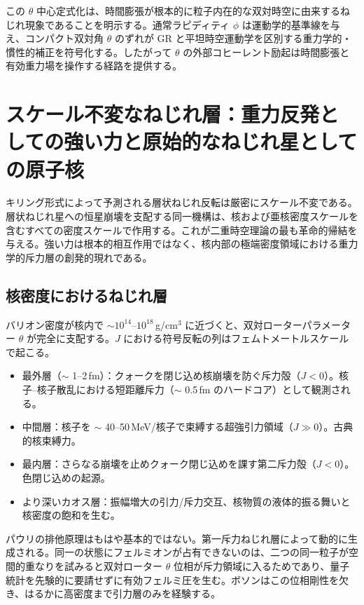 \documentclass[dvipdfmx,a4paper]{article}
\begin{document}
この $\theta$ 中心定式化は、時間膨張が根本的に粒子内在的な双対時空に由来するねじれ現象であることを明示する。通常ラピディティ $\phi$ は運動学的基準線を与え、コンパクト双対角 $\theta$ のずれが GR と平坦時空運動学を区別する重力学的・慣性的補正を符号化する。したがって $\theta$ の外部コヒーレント励起は時間膨張と有効重力場を操作する経路を提供する。

\section{スケール不変なねじれ層：重力反発としての強い力と原始的なねじれ星としての原子核}
\label{sec:nuclear}

キリング形式によって予測される層状ねじれ反転は厳密にスケール不変である。層状ねじれ星への恒星崩壊を支配する同一機構は、核および亜核密度スケールを含むすべての密度スケールで作用する。これが二重時空理論の最も革命的帰結を与える。強い力は根本的相互作用ではなく、核内部の極端密度領域における重力学的斥力層の創発的現れである。

\subsection{核密度におけるねじれ層}

バリオン密度が核内で $\sim 10^{14}$--$10^{18}$\,g/cm$^3$ に近づくと、双対ローターパラメーター $\theta$ が完全に支配する。$J$ における符号反転の列はフェムトメートルスケールで起こる。

\begin{itemize}
\item 最外層（$\sim$ 1--2\,fm）：クォークを閉じ込め核崩壊を防ぐ斥力殻（$J < 0$）。核子--核子散乱における短距離斥力（$\sim$ 0.5\,fm のハードコア）として観測される。
\item 中間層：核子を $\sim$ 40--50\,MeV/核子で束縛する超強引力領域（$J \gg 0$）。古典的核束縛力。
\item 最内層：さらなる崩壊を止めクォーク閉じ込めを課す第二斥力殻（$J < 0$）。色閉じ込めの起源。
\item より深いカオス層：振幅増大の引力/斥力交互、核物質の液体的振る舞いと核密度の飽和を生む。
\end{itemize}

パウリの排他原理はもはや基本的ではない。第一斥力ねじれ層によって動的に生成される。同一の状態にフェルミオンが占有できないのは、二つの同一粒子が空間的重なりを試みると双対ローター $\theta$ 位相が斥力領域に入るためであり、量子統計を先験的に要請せずに有効フェルミ圧を生む。ボソンはこの位相剛性を欠き、はるかに高密度まで引力層のみを経験する。
\end{document}
